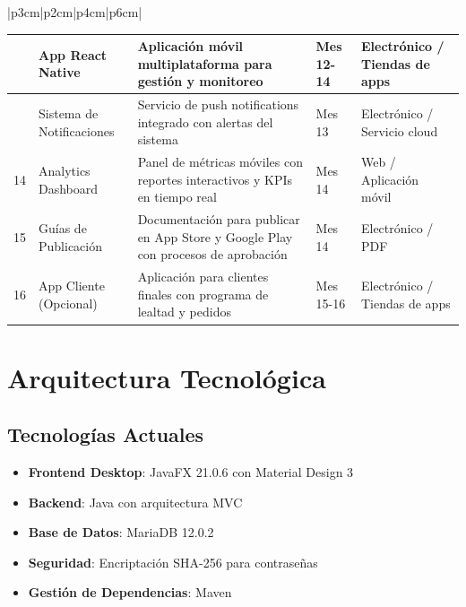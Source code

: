 \documentclass[12pt,letterpaper]{article}
\begin{document}
\begin{longtable}{|p{3cm}|p{2cm}|p{4cm}|p{6cm}|}
\begin{longtable}{|>{\centering}p{1cm}|p{4cm}|p{6cm}|>{\centering}p{2.5cm}|>{\centering\arraybackslash}p{2.5cm}|}
12 & App React Native & Aplicación móvil multiplataforma para gestión y monitoreo & Mes 12-14 & Electrónico / Tiendas de apps \\
\hline

13 & Sistema de Notificaciones & Servicio de push notifications integrado con alertas del sistema & Mes 13 & Electrónico / Servicio cloud \\
\hline

14 & Analytics Dashboard & Panel de métricas móviles con reportes interactivos y KPIs en tiempo real & Mes 14 & Web / Aplicación móvil \\
\hline

15 & Guías de Publicación & Documentación para publicar en App Store y Google Play con procesos de aprobación & Mes 14 & Electrónico / PDF \\
\hline

16 & App Cliente (Opcional) & Aplicación para clientes finales con programa de lealtad y pedidos & Mes 15-16 & Electrónico / Tiendas de apps \\
\hline
\end{longtable}

\section{Arquitectura Tecnológica}

\subsection{Tecnologías Actuales}
\begin{itemize}
    \item \textbf{Frontend Desktop}: JavaFX 21.0.6 con Material Design 3
    \item \textbf{Backend}: Java con arquitectura MVC
    \item \textbf{Base de Datos}: MariaDB 12.0.2
    \item \textbf{Seguridad}: Encriptación SHA-256 para contraseñas
    \item \textbf{Gestión de Dependencias}: Maven
\end{itemize}


\end{longtable}
\end{document}
